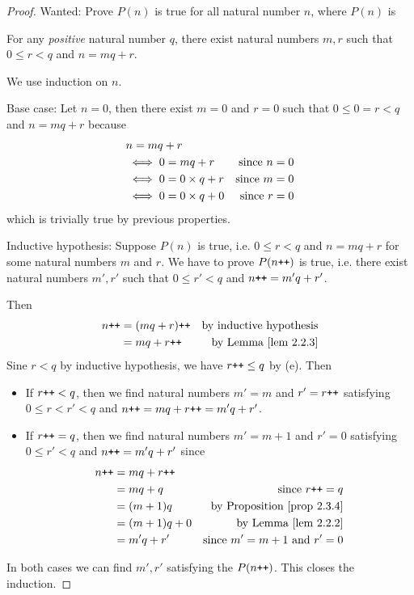 \begin{proof}
Wanted: Prove \(P(n)\) is true for all natural number \(n\), where \(P(n)\) is
\begin{center}
    For any \emph{positive} natural number \(q\), there exist natural numbers \(m, r\) such that \(0 \leq r < q\) and \(n = mq + r\).
\end{center}

We use induction on \(n\).

Base case: Let \(n = 0\), then there exist \(m = 0\) and \(r = 0\) such that \(0 \leq 0 = r < q\) and \(n = mq + r\) because
\begin{align*}
    & n = mq + r \\
    & \iff 0 = mq + r & \text{since \(n = 0\)} \\
    & \iff 0 = 0 \times q + r & \text{since \(m = 0\)} \\
    & \iff 0 = 0 \times q + 0 & \text{since \(r = 0\)} \\
\end{align*}
which is trivially true by previous properties.

Inductive hypothesis: Suppose \(P(n)\) is true, i.e. \(0 \leq r < q\) and \(n = mq + r\) for some natural numbers \(m\) and \(r\). We have to prove \(P(n\texttt{++})\) is true, i.e. there exist natural numbers \(m', r'\) such that \(0 \leq r' < q\) and \(n\texttt{++} = m'q + r'\).

Then
\begin{align*}
    n\INC & = (mq + r)\INC & \text{by inductive hypothesis} \\
          & = mq + r\INC   & \text{by \LEM{2.2.3}}
\end{align*}
Sine \(r < q\) by inductive hypothesis, we have \(r\texttt{++} \leq q\) by (e). Then
    \begin{itemize}
        \item If \(r\texttt{++} < q\), then we find natural numbers \(m' = m\) and \(r' = r\texttt{++}\) satisfying \(0 \leq r < r' < q\) and \(n\texttt{++} = mq + r\texttt{++} = m'q + r'\).
        \item If \(r\texttt{++} = q\), then we find natural numbers \(m' = m + 1\) and 
        \(r' = 0\) satisfying \(0 \leq r' < q\) and \(n\texttt{++} = m'q + r'\) since
        \begin{align*}
            n\INC & = mq + r\INC \\
                  & = mq + q     & \text{since \(r\INC = q\)} \\
                  & = (m + 1)q     & \text{by \PROP{2.3.4}} \\
                  & = (m + 1)q + 0 & \text{by \LEM{2.2.2}} \\
                  & = m'q + r'   & \text{since \(m' = m + 1\) and \(r' = 0\)}
        \end{align*}
    \end{itemize}
In both cases we can find \(m', r'\) satisfying the \(P(n\texttt{++})\). This closes the induction.
\end{proof}

